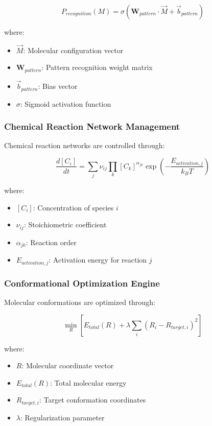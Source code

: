 \begin{equation}
P_{recognition}(M) = \sigma\left(\mathbf{W}_{pattern} \cdot \vec{M} + \vec{b}_{pattern}\right)
\end{equation}

where:
\begin{itemize}
\item $\vec{M}$: Molecular configuration vector
\item $\mathbf{W}_{pattern}$: Pattern recognition weight matrix
\item $\vec{b}_{pattern}$: Bias vector
\item $\sigma$: Sigmoid activation function
\end{itemize}

\subsubsection{Chemical Reaction Network Management}

Chemical reaction networks are controlled through:

\begin{equation}
\frac{d[C_i]}{dt} = \sum_j \nu_{ij} \prod_k [C_k]^{\alpha_{jk}} \exp\left(-\frac{E_{activation,j}}{k_B T}\right)
\end{equation}

where:
\begin{itemize}
\item $[C_i]$: Concentration of species $i$
\item $\nu_{ij}$: Stoichiometric coefficient
\item $\alpha_{jk}$: Reaction order
\item $E_{activation,j}$: Activation energy for reaction $j$
\end{itemize}

\subsubsection{Conformational Optimization Engine}

Molecular conformations are optimized through:

\begin{equation}
\min_{R} \left[ E_{total}(R) + \lambda \sum_i (R_i - R_{target,i})^2 \right]
\end{equation}

where:
\begin{itemize}
\item $R$: Molecular coordinate vector
\item $E_{total}(R)$: Total molecular energy
\item $R_{target,i}$: Target conformation coordinates
\item $\lambda$: Regularization parameter
\end{itemize}

